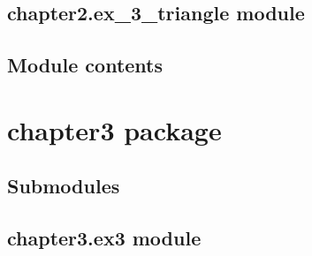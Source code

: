\documentclass[letterpaper,10pt,english]{sphinxmanual}
\begin{document}
\subsection{chapter2.ex\_3\_triangle module}
\label{\detokenize{chapter2:chapter2-ex-3-triangle-module}}

\subsection{Module contents}
\label{\detokenize{chapter2:module-chapter2}}\label{\detokenize{chapter2:module-contents}}
\sphinxstepscope


\section{chapter3 package}
\label{\detokenize{chapter3:chapter3-package}}\label{\detokenize{chapter3::doc}}

\subsection{Submodules}
\label{\detokenize{chapter3:submodules}}

\subsection{chapter3.ex3 module}
\label{\detokenize{chapter3:module-chapter3.ex3}}\label{\detokenize{chapter3:chapter3-ex3-module}}

\begin{fulllineitems}
\label{\detokenize{chapter3:chapter3.ex3.draw_grid}}
\pysigstartsignatures
{}
\pysigstopsignatures
\end{fulllineitems}

\end{document}
